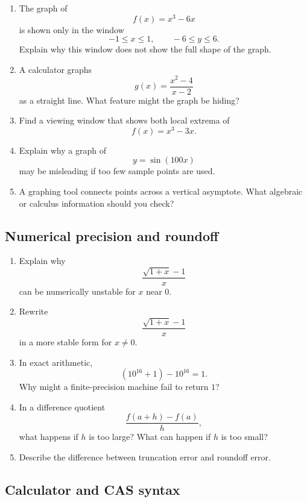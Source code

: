 \begin{enumerate}
\item The graph of
\[
f(x)=x^3-6x
\]
is shown only in the window
\[
-1\le x\le1,\qquad -6\le y\le6.
\]
Explain why this window does not show the full shape of the graph.

\item A calculator graphs
\[
g(x)=\frac{x^2-4}{x-2}
\]
as a straight line.  What feature might the graph be hiding?

\item Find a viewing window that shows both local extrema of
\[
f(x)=x^3-3x.
\]

\item Explain why a graph of
\[
y=\sin(100x)
\]
may be misleading if too few sample points are used.

\item A graphing tool connects points across a vertical asymptote.  What algebraic or
calculus information should you check?
\end{enumerate}

\subsection*{Numerical precision and roundoff}

\begin{enumerate}
\item Explain why
\[
\frac{\sqrt{1+x}-1}{x}
\]
can be numerically unstable for \(x\) near \(0\).

\item Rewrite
\[
\frac{\sqrt{1+x}-1}{x}
\]
in a more stable form for \(x\neq0\).

\item In exact arithmetic,
\[
(10^{16}+1)-10^{16}=1.
\]
Why might a finite-precision machine fail to return \(1\)?

\item In a difference quotient
\[
\frac{f(a+h)-f(a)}{h},
\]
what happens if \(h\) is too large?  What can happen if \(h\) is too small?

\item Describe the difference between truncation error and roundoff error.
\end{enumerate}

\subsection*{Calculator and CAS syntax}

